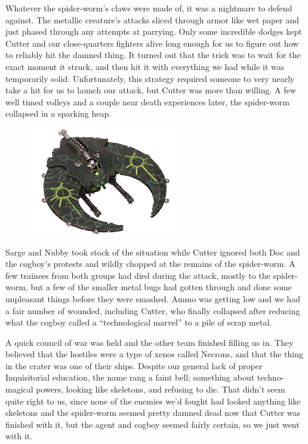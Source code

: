 Whatever the spider-worm’s claws were made of, it was a nightmare to defend against. 
The metallic creature’s attacks sliced through armor like wet paper and just phased through any attempts at parrying. 
Only some incredible dodges kept Cutter and our close-quarters fighters alive long enough for us to figure out how to reliably hit the damned thing. 
It turned out that the trick was to wait for the exact moment it struck, and then hit it with everything we had while it was temporarily solid. 
Unfortunately, this strategy required someone to very nearly take a hit for us to launch our attack, but Cutter was more than willing. 
A few well timed volleys and a couple near death experiences later, the spider-worm collapsed in a sparking heap.

\begin{figure}
	\begin{center}
		\includegraphics[width=\figwidth]{pics/8/43.png}
	\end{center}
\end{figure}
Sarge and Nubby took stock of the situation while Cutter ignored both Doc and the cogboy’s protests and wildly chopped at the remains of the spider-worm. 
A few trainees from both groups had died during the attack, mostly to the spider-worm, but a few of the smaller metal bugs had gotten through and done some unpleasant things before they were smashed. 
Ammo was getting low and we had a fair number of wounded, including Cutter, who finally collapsed after reducing what the cogboy called a “technological marvel” to a pile of scrap metal.

A quick council of war was held and the other team finished filling us in. 
They believed that the hostiles were a type of xenos called Necrons, and that the thing in the crater was one of their ships. 
Despite our general lack of proper Inquisitorial education, the name rang a faint bell; 
something about techno-magical powers, looking like skeletons, and refusing to die. 
That didn’t seem quite right to us, since none of the enemies we’d fought had looked anything like skeletons and the spider-worm seemed pretty damned dead now that Cutter was finished with it, but the agent and cogboy seemed fairly certain, so we just went with it.

